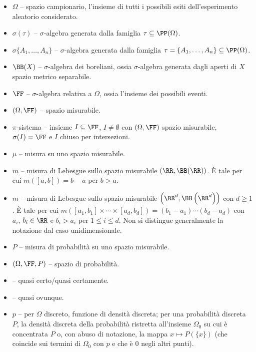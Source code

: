 \begin{multicols*}{2}
    \begin{itemize}
        \item $\Omega$ -- spazio campionario, l'insieme di tutti i possibili esiti dell'esperimento aleatorio considerato.
        \item $\sigma(\tau)$ -- $\sigma$-algebra generata dalla famiglia $\tau \subseteq \PP(\Omega)$.
        \item $\sigma\{A_1, \ldots, A_n\}$ -- $\sigma$-algebra generata dalla famiglia
        $\tau = \{A_1, \ldots, A_n\} \subseteq \PP(\Omega)$.
        \item $\BB(X)$ -- $\sigma$-algebra dei boreliani, ossia $\sigma$-algebra generata dagli aperti di $X$ spazio metrico separabile.
        \item $\FF$ -- $\sigma$-algebra relativa a $\Omega$, ossia l'insieme dei possibili eventi.
        \item $(\Omega, \FF)$ -- spazio misurabile.
        \item $\pi$-sistema -- insieme $I \subseteq \FF$, $I \neq \emptyset$ con $(\Omega, \FF)$ spazio misurabile, $\sigma(I) = \FF$ e $I$ chiuso per intersezioni.
        \item $\mu$ -- misura su uno spazio misurabile.
        \item $m$ -- misura di Lebesgue sullo spazio misurabile $(\RR, \BB(\RR))$. È tale per cui $m([a, b]) = b-a$ per $b > a$.
        \item $m$ -- misura di Lebesgue sullo spazio misurabile $\left(\RR^d, \BB\left(\RR^d\right)\right)$ con $d \geq 1$. È tale per cui
        $m\left([a_1, b_1] \times \cdots \times [a_d, b_d]\right) = (b_1 - a_1) \cdots (b_d - a_d)$ con $a_i$, $b_i \in \RR$ e
        $b_i > a_i$ per $1 \leq i \leq d$. Non si distingue generalmente la notazione dal caso unidimensionale.
        \item $P$ -- misura di probabilità su uno spazio misurabile.
        \item $(\Omega, \FF, P)$ -- spazio di probabilità.
        \item \qc -- quasi certo/quasi certamente.
        \item \qo -- quasi ovunque.
        \item $p$ -- per $\Omega$ discreto, funzione di densità discreta; per una probabilità discreta $P$, la densità discreta della probabilità
        ristretta all'insieme $\Omega_0$ su cui è concentrata $P$ o, con abuso di notazione, la mappa $x \mapsto P(\{x\})$ (che coincide
        sui termini di $\Omega_0$ con $p$ e che è $0$ negli altri punti).

\end{itemize}
\end{multicols*}

